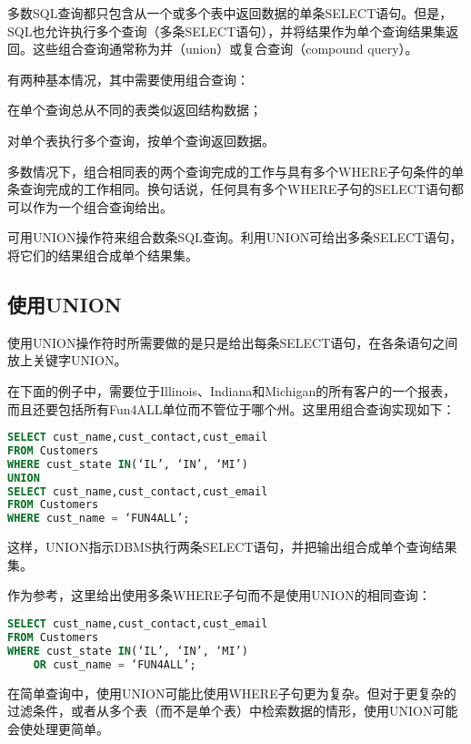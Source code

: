 多数SQL查询都只包含从一个或多个表中返回数据的单条SELECT语句。但是，SQL也允许执行多个查询（多条SELECT语句），并将结果作为单个查询结果集返回。这些组合查询通常称为并（union）或复合查询（compound query）。


有两种基本情况，其中需要使用组合查询：

\begin{compactitem}
\item 在单个查询总从不同的表类似返回结构数据；
\item 对单个表执行多个查询，按单个查询返回数据。
\end{compactitem}

多数情况下，组合相同表的两个查询完成的工作与具有多个WHERE子句条件的单条查询完成的工作相同。换句话说，任何具有多个WHERE子句的SELECT语句都可以作为一个组合查询给出。

可用UNION操作符来组合数条SQL查询。利用UNION可给出多条SELECT语句，将它们的结果组合成单个结果集。



\subsection{使用UNION}

使用UNION操作符时所需要做的是只是给出每条SELECT语句，在各条语句之间放上关键字UNION。

在下面的例子中，需要位于Illinois、Indiana和Michigan的所有客户的一个报表，而且还要包括所有Fun4ALL单位而不管位于哪个州。这里用组合查询实现如下：

\begin{lstlisting}[language=SQL]
SELECT cust_name,cust_contact,cust_email
FROM Customers
WHERE cust_state IN(‘IL’, ‘IN’, ‘MI’)
UNION
SELECT cust_name,cust_contact,cust_email
FROM Customers
WHERE cust_name = ‘FUN4ALL’;
\end{lstlisting}

这样，UNION指示DBMS执行两条SELECT语句，并把输出组合成单个查询结果集。

作为参考，这里给出使用多条WHERE子句而不是使用UNION的相同查询：

\begin{lstlisting}[language=SQL]
SELECT cust_name,cust_contact,cust_email
FROM Customers
WHERE cust_state IN(‘IL’, ‘IN’, ‘MI’)
	OR cust_name = ‘FUN4ALL’;
\end{lstlisting}

在简单查询中，使用UNION可能比使用WHERE子句更为复杂。但对于更复杂的过滤条件，或者从多个表（而不是单个表）中检索数据的情形，使用UNION可能会使处理更简单。

